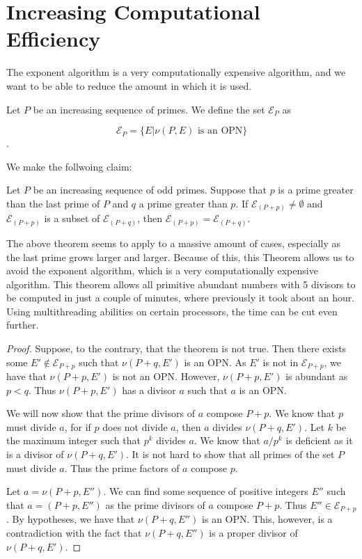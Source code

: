 \documentclass[../paper.tex]{subfiles}
\begin{document}
\section{Increasing Computational Efficiency}

The exponent algorithm is a very computationally expensive
algorithm, and we want to be able to reduce the amount in which it
is used. 

Let $P$ be an increasing sequence of primes. We define the set
$\mathcal{E}_P$ as 

$$\mathcal{E}_P = \{E | \nu(P, E) \text{ is an OPN}\}$$.

We make the follwoing claim:

\begin{theorem} 
Let $P$ be an increasing sequence of odd primes. Suppose
that $p$ is a prime greater than the last prime of $P$ and $q$ a
prime greater than $p$. If $\mathcal{E}_{(P + p)} \neq 
\emptyset$ and $\mathcal{E}_{(P + p)}$ is a subset of 
$\mathcal{E}_{(P + q)}$, then $\mathcal{E}_{(P + p)} = 
\mathcal{E}_{(P + q)}$.
\end{theorem}

The above theorem seems to apply to a massive amount of cases,
especially as the last prime grows larger and larger. Because of
this, this Theorem allows us to avoid the exponent algorithm,
which is a very computationally expensive algorithm. This theorem
allows all primitive abundant numbers with 5 divisors to be
computed in just a couple of minutes, where previously it took
about an hour. Using multithreading abilities on certain
processors, the time can be cut even further.

\begin{proof}
  Suppose, to the contrary, that the theorem is not true. Then
there exists some $E' \notin \mathcal{E}_{P + p}$ such that $\nu
(P + q, E')$ is an OPN. As $E'$ is not in $\mathcal{E}_{P + p}$,
we have that $\nu (P + p, E')$ is not an OPN. However, $\nu (P +
p, E')$ is abundant as $p < q$. Thus $\nu (P + p, E')$ has a
divisor $a$ such that $a$ is an OPN. 

  We will now show that the prime divisors of $a$ compose $P + p$.
We know that $p$ must divide $a$, for if $p$ does not divide $a$,
then $a$ divides $\nu (P + q, E')$. Let $k$ be the maximum
integer such that $p^k$ divides $a$. We know that $a / p^k$ is
deficient as it is a divisor of $\nu (P + q, E')$. It is not hard
to show that all primes of the set $P$ must divide $a$. Thus the
prime factors of $a$ compose $p$. 

  Let $a = \nu(P + p, E'')$. We can find some sequence of positive
integers $E''$ such that $a = (P + p, E'')$ as the prime divisors
of $a$ compose $P + p$. Thus $E'' \in \mathcal{E}_{P + p}$. By
hypotheses, we have that $\nu(P + q, E'')$ is an OPN. This,
however, is a contradiction with the fact that $\nu(P + q, E'')$
is a proper divisor of $\nu(P + q, E')$.
\end{proof}
\end{document}
